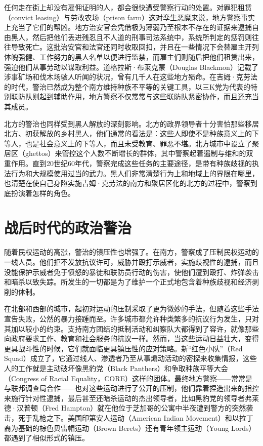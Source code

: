 \documentclass[fontset=fandol, a4paper, 12pt, openright]{ctexbook}
\begin{document}
任何走在街上却没有雇佣证明的人，都会很快遭受警察行动的处置。对罪犯租赁（convict leasing）与劳改农场（prison farm）这对孪生恶魔来说，地方警察事实上充当了它们的帮凶。地方治安官会凭借极为薄弱乃至根本不存在的证据来逮捕自由黑人，然后把他们丢进残忍且不人道的刑事司法系统中，系统所判定的惩罚则往往导致死亡。这批治安官和法官还同时收取回扣，并且在一些情况下会替雇主开列体魄强健、工作努力的黑人名单以便进行监禁，而雇主们则随后把他们租赁出来，强迫他们从事劳动以谋取利益。道格拉斯·布莱克蒙（Douglas Blackmon）记载了涉事矿场和伐木场骇人听闻的状况，曾有几千人在这些地方殒命。在吉姆·克劳法的时代，警治已然成为整个南方维持种族不平等的关键工具，以三K党为代表的特别联防队则起到辅助作用，地方警察不仅常常与这些联防队紧密协作，而且还充当其成员。

北方的警治也同样受到黑人解放的深刻影响。北方的政界领导者十分害怕那些移居北方、初获解放的乡村黑人，他们通常的看法是：这些人即使不是种族意义上的下等人，也是社会意义上的下等人，而且未受教育、罪恶不堪。北方城市中设立了聚居区（ghettos）来管控这个人数不断增长的群体，其中警察起着遏制与维和的双重作用。直到20世纪60年代，警察完成这些任务的主要途径，是带有种族歧视的执法行为和大规模使用过当的武力。黑人们非常清楚行为上和地域上的界限在哪里，也清楚在使自己身陷实施吉姆·克劳法的南方和聚居区化的北方的过程中，警察到底扮演着怎样的角色。

\section{战后时代的政治警治}

随着民权运动的高涨，警治的镇压性也增强了。在南方，警察成了压制民权运动的一线人员。他们拒不发放抗议许可，威胁并殴打示威者，实施歧视性的逮捕，而且没能保护示威者免于愤怒的暴徒和联防员行动的伤害，使他们遭到殴打、炸弹袭击和暗杀以致失踪。所发生的一切都是为了维护一个正式地包含着种族歧视和经济剥削的体制。

在北部和西部的城市，起初对运动的压制采取了更为微妙的手法，但随着这些手法宣告失败，公然的暴力接踵而至。许多城市都允许种类繁多的抗议行为发生，只对其加以较小的约束。支持南方团结的抵制活动和纠察队大都得到了容许，就像那些向政府要求工作、教育和社会服务的抗议一样。然而，当这些运动日益壮大，变得更具战斗性的时候，它们就面临更具镇压性的应对策略。新“红色小队”（Red Squad）成立了，它通过线人、渗透者乃至从事煽动活动的密探来收集情报，这些人的工作就是主动破坏像黑豹党（Black Panthers）和争取种族平等大会（Congress of Racial Equality，CORE）这样的团体。最终地方警察——常常是与联邦调查局合作——也对这些运动进行了公开的压制，他们靠着捏造出来的指控来施行针对性逮捕，最后甚至还暗杀运动的杰出领导者，比如黑豹党的领导者弗莱德·汉普顿（Fred Hampton）就在他位于芝加哥的公寓中半夜遭到警方的突然袭击，死于乱枪之下。美国印第安人运动（American Indian Movement）和以拉丁裔为基础的棕色贝雷帽运动（Brown Berets）还有青年领主运动（Young Lords）都遇到了相似形式的镇压。
\end{document}
